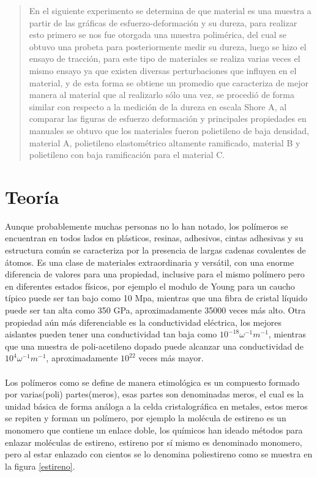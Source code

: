 \documentclass[a4paper, 11pt]{article}
\begin{document}
\renewcommand{\contentsname}{Lista de Contenidos}
\renewcommand{\listfigurename}{Lista de Figuras}
\renewcommand{\listtablename}{Lista de Tablas}
\renewcommand{\tablename}{Tabla}
\tableofcontents
\listoffigures
\listoftables
\thispagestyle{empty}
\newpage
\newcommand{\angstrom}{\mbox{\normalfont\AA}}

\begin{abstract}
En el siguiente experimento se determina de que material es una muestra a partir de las gráficas de esfuerzo-deformación y su dureza, para realizar esto primero se nos fue otorgada una muestra polimérica, del cual se obtuvo una probeta para posteriormente medir su dureza, luego se hizo el ensayo de tracción, para este tipo de materiales se realiza varias veces el mismo ensayo ya que existen diversas perturbaciones que influyen en el material, y de esta forma se obtiene un promedio que caracteriza de mejor manera al material que al realizarlo sólo una vez, se procedió de forma similar  con respecto a la medición de la dureza en escala Shore A, al comparar las figuras de esfuerzo deformación y principales propiedades en manuales se obtuvo que los materiales fueron polietileno de baja densidad, material A, polietileno elastométrico altamente ramificado, material B y polietileno con baja ramificación para el material C.
\end{abstract}

\section{Teor\'ia}
\setcounter{page}{1}
Aunque probablemente muchas personas no lo han notado, los polímeros se encuentran en todos lados en plásticos, resinas, adhesivos, cintas adhesivas y su estructura común se caracteriza por la presencia de largas cadenas covalentes de átomos. Es una clase de materiales extraordinaria y versátil, con una enorme diferencia de valores para una propiedad, inclusive para el mismo polímero pero en diferentes estados físicos, por ejemplo el modulo de Young para un caucho típico puede ser tan bajo como 10 Mpa, mientras que una fibra de cristal líquido puede ser tan alta como 350 GPa, aproximadamente 35000 veces más alto. Otra propiedad aún más diferenciable es la conductividad eléctrica, los mejores aislantes pueden tener una conductividad tan baja como $10^{-18} \omega^{-1} m^{-1}$, mientras que una muestra de poli-acetileno dopado puede alcanzar una conductividad de $10^{4} \omega^{-1} m^{-1}$, aproximadamente $10^{22}$ veces más mayor.   
\\
\\
Los polímeros como se define de manera etimológica es un compuesto formado por varias(poli) partes(meros), esas partes son denominadas meros, el cual es la unidad básica de forma análoga a la celda cristalográfica en metales, estos meros se repiten y forman un polímero, por ejemplo la molécula de estireno es un monomero que contiene un enlace doble, los químicos han ideado métodos para enlazar moléculas de estireno, estireno por sí mismo es denominado monomero, pero al estar enlazado con cientos se lo denomina poliestireno como se muestra en la figura \ref{estireno}.\\
\end{document}
